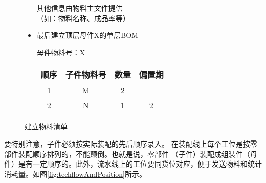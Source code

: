 \begin{figure}[H]
\begin{itemize}
\begin{minipage}{14em}
                        其他信息由物料主文件提供 \\ （如：物料名称、成品率等）
                    \end{minipage}

                \item 最后建立顶层母件X的单层BOM \vskip 3mm

                    \begin{minipage}{21em}
                        \footnotesize  母件物料号：X
                        \vskip 2mm
                        \begin{tabular}{c|c|c|c}
                            顺序 & 子件物料号 & 数量 & 偏置期 \\ \hline
                            1 & M & 2 & \\
                            2 & N & 1 & 2 \\
                        \end{tabular}
                    \end{minipage}
                    \begin{minipage}{8em}
                        \centering \footnotesize
                    \end{minipage}

            \end{itemize}
            \caption{建立物料清单} \label{fig:createBom}
        \end{figure}

        要特别注意，子件必须按实际装配的先后顺序录入。 在装配线上每个工位是按零部件装配顺序排列的，不能颠倒。也就是说，零部件 （子件）装配成组装件（母件）是有一定顺序的。此外，流水线上的工位要同货位对应，便于发送物料和统计消耗量。如图\ref{fig:techflowAndPosition}所示。

